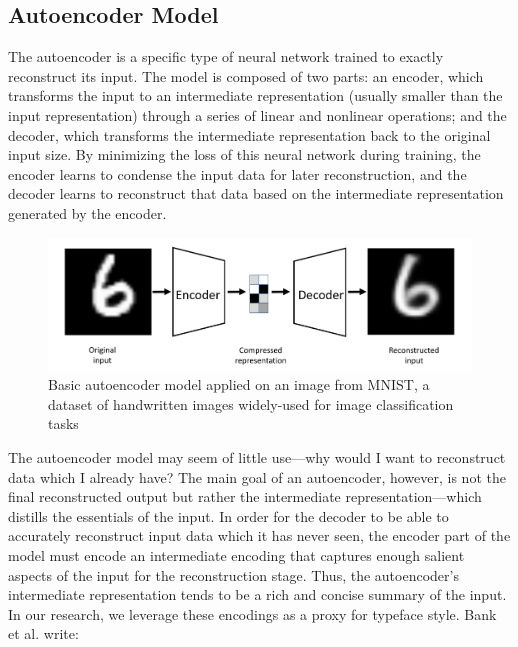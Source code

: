 \subsection{Autoencoder Model}

The autoencoder \cite{rumelhart1986} is a specific type of neural network trained to exactly reconstruct its input. The model is composed of two parts: an encoder, which transforms the input to an intermediate representation (usually smaller than the input representation) through a series of linear and nonlinear operations; and the decoder, which transforms the intermediate representation back to the original input size. By minimizing the loss of this neural network during training, the encoder learns to condense the input data for later reconstruction, and the decoder learns to reconstruct that data based on the intermediate representation generated by the encoder.

\begin{figure}[h]
    \centering
    \includegraphics[width=\textwidth]{images/autoencoder-model.png}
    \caption{Basic autoencoder model applied on an image from MNIST, a dataset of handwritten images widely-used for image classification tasks \cite{lecun1998}}
    \label{fig:autoencoder-model}
\end{figure}

The autoencoder model may seem of little use---why would I want to reconstruct data which I already have? The main goal of an autoencoder, however, is not the final reconstructed output but rather the intermediate representation---which distills the essentials of the input. In order for the decoder to be able to accurately reconstruct input data which it has never seen, the encoder part of the model must encode an intermediate encoding that captures enough salient aspects of the input for the reconstruction stage. Thus, the autoencoder's intermediate representation tends to be a rich and concise summary of the input. In our research, we leverage these encodings as a proxy for typeface style. Bank et al. \cite{bank2021autoencoders} write:


